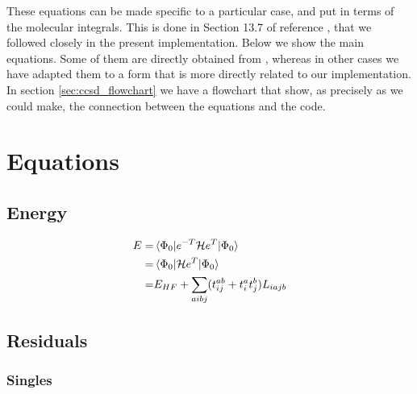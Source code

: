 These equations can be made specific to a particular case,
and put in terms of the molecular integrals.
This is done in Section 13.7 of reference \cite{}, that we followed closely in the present
implementation.
Below we show the main equations.
Some of them are directly obtained from \cite{},
whereas in other cases we have adapted them to a form that is more directly related to our implementation.
In section \ref{sec:ccsd_flowchart} we have a flowchart that show,
as precisely as we could make,
the connection between the equations and the code.


\section{Equations}

\subsection{Energy}
\hypertarget{sec:ccsd_energy}{}
\label{sec:ccsd_energy}

\begin{equation}
  \begin{split}
    E =& \mel{\Phi_0}{e^{-T}\ensuremath{\mathcal{H}}e^T}{\Phi_0}\\
    =& \mel{\Phi_0}{\ensuremath{\mathcal{H}}e^T}{\Phi_0}\\
    =& E_{HF} + \sum_{aibj}(t_{ij}^{ab} + t_i^at_j^b) L_{iajb}
  \end{split}
\end{equation}


\subsection{Residuals}
\hypertarget{sec:ccsd_res}{}
\label{sec:ccsd_res}

\subsubsection{Singles}
\hypertarget{sec:ccsd_res_sing}{}
\label{sec:ccsd_res_sing}

